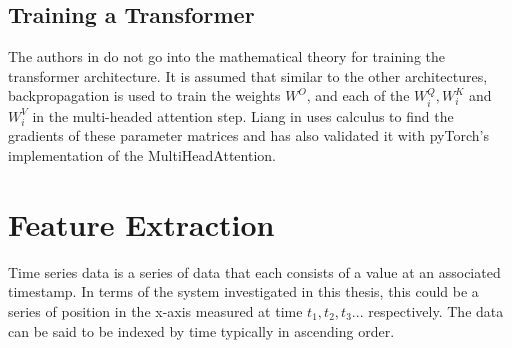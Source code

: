 \subsection{Training a Transformer}
The authors in \cite{vaswaniAttentionAllYou2023} do not go into the mathematical theory for training the transformer architecture. It is assumed that similar to the other architectures, backpropagation is used to train the weights $W^O$, and each of the $W_i^Q, W_i^K$ and $W_i^V$ in the multi-headed attention step. Liang in \cite{longxTransformerAttentionLayer2022} uses calculus to find the gradients of these parameter matrices and has also validated it with pyTorch's implementation of the MultiHeadAttention.

\clearpage
\section{Feature Extraction}
Time series data is a series of data that each consists of a value at an associated timestamp. In terms of the system investigated in this thesis, this could be a series of position in the x-axis measured at time $t_1, t_2, t_3...$ respectively. The data can be said to be indexed by time \cite{yinPredictionAnalysisTime2023} typically in ascending order.

